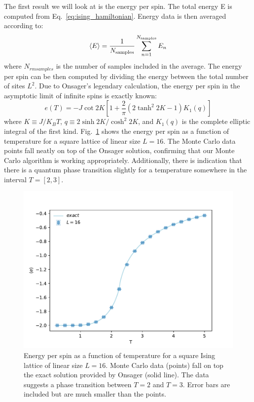 \documentclass[12pt]{article}
\newcommand{\figref}[1]{Fig.~\ref{#1}}
\begin{document}
The first result we will look at is the energy per spin. The total energy E is computed from Eq.~\eqref{eq:ising_hamiltonian}. Energy data is then averaged according to:
%
\begin{equation}
\langle E \rangle = \frac{1}{N_{\rm{samples}}} \sum_{n=1}^{N_{\rm{samples}}} E_n
\end{equation}
%
where $N_{rm{samples}}$ is the number of samples included in the average. The energy per spin can be then computed by dividing the energy between the total number of sites $L^2$. Due to Onsager's legendary calculation, the energy per spin in the asymptotic limit of infinite spins is exactly known:
%
\begin{equation}
e(T) = -J \cot 2K [ 1 + \frac{2}{\pi} (2 \tanh^2 2K - 1)K_1(q)]
\label{eq:e_exact}
\end{equation}
%
where $K\equiv J/K_BT$, $q \equiv 2 \sinh 2K / \cosh^2 2K$, and $K_1(q)$ is the complete elliptic integral of the first kind. \figref{fig:internal_energy} shows the energy per spin as a function of temperature for a square lattice of linear size $L=16$. The Monte Carlo data points fall neatly on top of the Onsager solution, confirming that our Monte Carlo algorithm is working appropriately. Additionally, there is indication that there is a quantum phase transition slightly for a temperature somewhere in the interval $T=[2,3]$.

\begin{figure}[t]
\begin{center}
\includegraphics[width=0.7\columnwidth]{Figures/b_e_per_spin}
\end{center}
\caption{Energy per spin as a function of temperature for a square Ising lattice of linear size $L=16$. Monte Carlo data (points) fall on top the exact solution provided by Onsager (solid line). The data suggests a phase transition between $T=2$ and $T=3$. Error bars are included but are much smaller than the points.}
\label{fig:internal_energy}
\end{figure}
\end{document}
